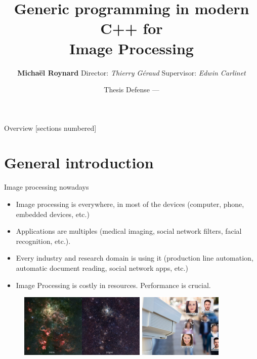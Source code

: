 \documentclass[12pt,aspectratio=169]{beamer}
\title{Generic programming in modern C++ for\\ Image Processing}
\date{Thesis Defense --- \displaydate{dateSoutenance}}
\author{\textbf{Michaël Roynard} \hspace{1cm} Director: \emph{Thierry Géraud} \hspace{1cm} Supervisor: \emph{Edwin Carlinet}}
\institute{EPITA Research Laboratory (LRE) --- Le Kremlin-Bicêtre, France}
\begin{document}
\maketitle

\begin{frame}{Overview}
  [sections numbered]
  \tableofcontents[hideallsubsections]
\end{frame}

%
%
%

\section[General introduction]{General introduction}

\begin{frame}[fragile]{Image processing nowadays}
  \begin{itemize}
    \item Image processing is everywhere, in most of the devices (computer, phone, embedded devices, etc.)
    \item Applications are multiples (medical imaging, social network filters, facial recognition, etc.).
    \item Every industry and research domain is using it (production line automation, automatic document reading, social network apps, etc.)
    \item Image Processing is costly in resources. Performance is crucial.
  \end{itemize}
  \begin{figure}[bl]
    \hfill
    \includegraphics[height=3cm]{../illustrations/rgb_infrared}
    \hfill
    \includegraphics[height=3cm]{../illustrations/camera}
    \hspace{1cm}
  \end{figure}
\end{frame}
\end{document}
